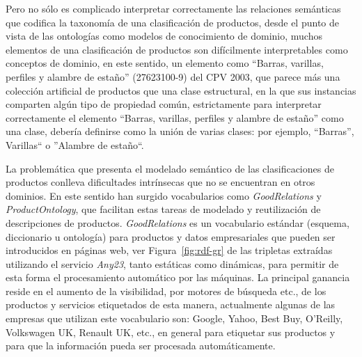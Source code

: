Pero no sólo es complicado interpretar correctamente las relaciones semánticas
que codifica la taxonomía de una clasificación de productos, desde el punto de vista de las ontologías
como modelos de conocimiento de dominio, muchos elementos de una clasificación de productos son
difícilmente interpretables como conceptos de dominio, en este sentido, un elemento como ``Barras, varillas, perfiles y alambre de
estaño'' (27623100-9) del CPV 2003, que parece más una colección
artificial de productos que una clase estructural, en la que sus instancias
comparten algún tipo de propiedad común, estrictamente para
interpretar correctamente el elemento ``Barras, varillas, perfiles y alambre de
estaño'' como una clase, debería definirse como la unión de varias clases:
por ejemplo, ``Barras'', Varillas`` o ''Alambre de estaño``.

La problemática que presenta el modelado semántico de las clasificaciones de productos
conlleva dificultades intrínsecas que no se encuentran en otros dominios. En este
sentido han surgido vocabularios como \textit{GoodRelations} y \textit{ProductOntology}, que facilitan
estas tareas de modelado y reutilización de descripciones de productos. \textit{GoodRelations}
es un vocabulario estándar (esquema, diccionario u ontología) para productos y datos empresariales 
que pueden ser introducidos en páginas web, ver Figura~\ref{fig:rdf-gr} de las tripletas
extraídas utilizando el servicio \textit{Any23}, tanto estáticas como dinámicas, para permitir de esta forma el procesamiento automático por las máquinas. La principal ganancia
reside en el aumento de la visibilidad, por motores de búsqueda etc., de los productos y servicios 
etiquetados de esta manera, actualmente algunas de las empresas que utilizan este vocabulario
son: Google, Yahoo, Best Buy, O'Reilly, Volkswagen UK, Renault UK, etc., en general para etiquetar
sus productos y para que la información pueda ser procesada automáticamente.


